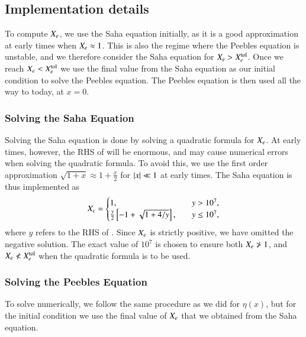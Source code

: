 
\subsection{Implementation details}\label{ssec:M2:implementations} 
To compute $X_e$, we use the Saha equation initially, as it is a good approximation at early times when $X_e \approx 1$. This is also the regime where the Peebles equation is unstable, and we therefore consider the Saha equation for $X_e>X_e^\mathrm{tol}$. Once we reach $X_e<X_e^\mathrm{tol}$ we use the final value from the Saha equation as our initial condition to solve the Peebles equation. The Peebles equation is then used all the way to today, at $x=0$. 

\subsubsection{Solving the Saha Equation}\label{sssec:M2:implementations:solving_saha}
Solving the Saha equation is done by solving a quadratic formula for $X_e$. At early times, however, the RHS of  will be enormous, and may cause numerical errors when solving the quadratic formula. To avoid this, we use the first order approximation $\sqrt{1+x}\approx 1 + \frac{x}{2}$ for $\abs{x}\ll1$ at early times. The Saha equation is thus implemented as   
\begin{equation}
    X_e = \begin{cases}
        1, \quad & y>10^7, \\
        \frac{y}{2}\left[ -1 + \sqrt{1 + 4/y} \right],\quad & y\leq 10^7,
    \end{cases}
\end{equation}  
where $y$ refers to the RHS of . Since $X_e$ is strictly positive, we have omitted the negative solution. The exact value of $10^7$ is chosen to ensure both $X_e \ngtr 1$, and $X_e\nless X_e^\mathrm{tol}$ when the quadratic formula is to be used.

\subsubsection{Solving the Peebles Equation}\label{sssec:M2:implementations:solving_peebles}
To solve  numerically, we follow the same procedure as we did for $\eta(x)$, but for the initial condition we use the final value of $X_e$ that we obtained from the Saha equation. 


